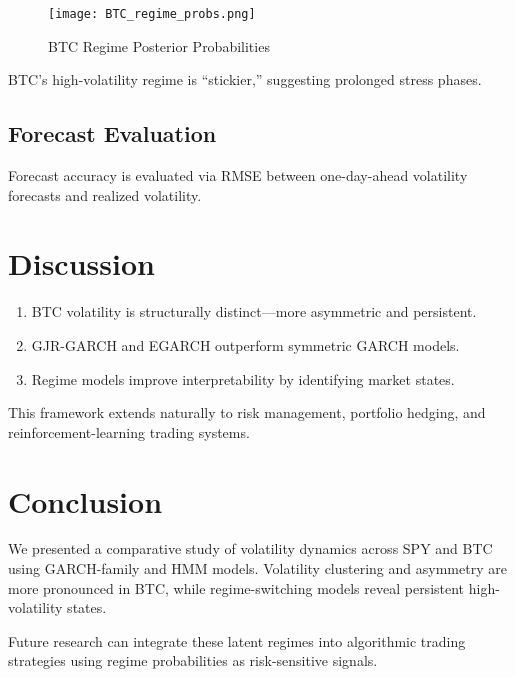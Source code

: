 \documentclass[12pt]{article}
\begin{document}
\begin{figure}[h!]
\centering
\texttt{[image: BTC\_regime\_probs.png]}
\caption{BTC Regime Posterior Probabilities}
\end{figure}

BTC’s high-volatility regime is ``stickier,'' suggesting prolonged stress phases.

\FloatBarrier
\subsection{Forecast Evaluation}
Forecast accuracy is evaluated via RMSE between one-day-ahead volatility forecasts and realized volatility.

\FloatBarrier
\section{Discussion}
\begin{enumerate}
    \item BTC volatility is structurally distinct—more asymmetric and persistent.
    \item GJR-GARCH and EGARCH outperform symmetric GARCH models.
    \item Regime models improve interpretability by identifying market states.
\end{enumerate}

This framework extends naturally to risk management, portfolio hedging, and reinforcement-learning trading systems.

\FloatBarrier
\section{Conclusion}
We presented a comparative study of volatility dynamics across SPY and BTC using GARCH-family and HMM models. Volatility clustering and asymmetry are more pronounced in BTC, while regime-switching models reveal persistent high-volatility states. 

Future research can integrate these latent regimes into algorithmic trading strategies using regime probabilities as risk-sensitive signals.

\FloatBarrier


\end{document}
